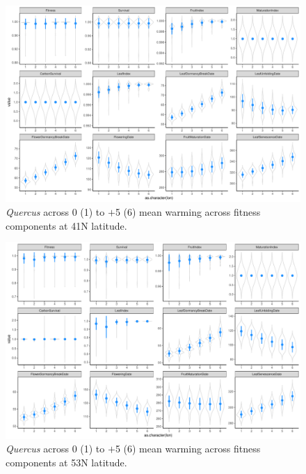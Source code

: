 \documentclass[11pt,letter]{article}
\begin{document}
\begin{figure} 
 \begin{center}
\noindent \includegraphics[width=1\textwidth]{..//analyses/graphs/phenofit/sims/meansim41_allmetricsQR.pdf}
  \caption{\emph{Quercus} across 0 (1) to $+$5 (6) mean warming across fitness components at 41\degree N latitude. }
  \label{fig:quercusmean41}
  \end{center}
\end{figure}

\begin{figure} 
 \begin{center}
\noindent \includegraphics[width=1\textwidth]{..//analyses/graphs/phenofit/sims/meansim53_allmetricsQR.pdf}
  \caption{\emph{Quercus} across 0 (1) to $+$5 (6) mean warming across fitness components at 53\degree N latitude. }
  \label{fig:quercusmean53}
  \end{center}
\end{figure}
\end{document}
